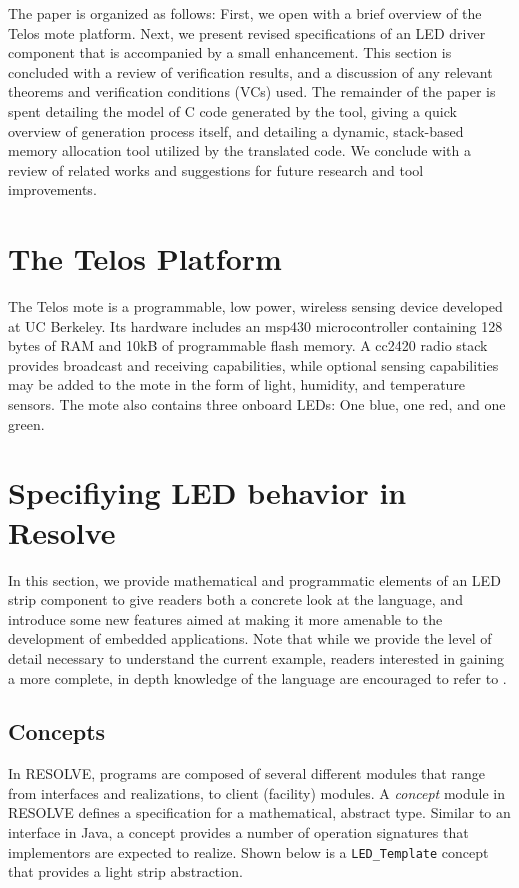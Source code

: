 \documentclass{sig-alternate}
\begin{document}
The paper is organized as follows: First, we open with a brief overview of the Telos mote platform. Next, we present revised specifications of an LED driver component that is accompanied by a small enhancement. This section is concluded with a review of verification results, and a discussion of any relevant theorems and verification conditions (VCs) used. The remainder of the paper is spent detailing the model of C code generated by the tool, giving a quick overview of generation process itself, and detailing a dynamic, stack-based memory allocation tool utilized by the translated code. We conclude with a review of related works and suggestions for future research and tool improvements.

\section{The Telos Platform}

The Telos mote \cite{polastre:2005} is a programmable, low power, wireless sensing device developed at UC Berkeley. Its hardware includes an msp430 microcontroller containing 128 bytes of RAM and 10kB of programmable flash memory. A cc2420 radio stack provides broadcast and receiving capabilities, while optional sensing capabilities may be added to the mote in the form of light, humidity, and temperature sensors. The mote also contains three onboard LEDs: One blue, one red, and one green.

\section{Specifiying LED behavior in Resolve}
\label{sec:specifiying}

In this section, we provide mathematical and programmatic elements of an LED strip component to give readers both a concrete look at the language, and introduce some new features aimed at making it more amenable to the development of embedded applications. Note that while we provide the level of detail necessary to understand the current example, readers interested in gaining a more complete, in depth knowledge of the language are encouraged to refer to \cite{sitaraman:2011, kulczycki:2008}.

\subsection{Concepts}
\label{ssec:concepts}
In RESOLVE, programs are composed of several different modules that range from interfaces and realizations, to client (facility) modules. A \textit{concept} module in RESOLVE defines a specification for a mathematical, abstract type. Similar to an interface in Java, a concept provides a number of operation signatures that implementors are expected to realize. Shown below is a \texttt{LED\_Template} concept that provides a light strip abstraction.
\end{document}
